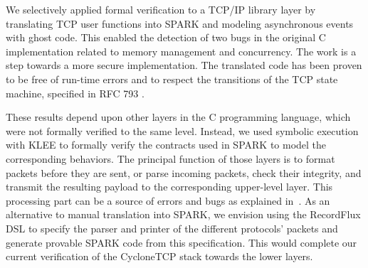 \documentclass[conference]{IEEEtran}
\begin{document}
We selectively applied formal verification to a TCP/IP library layer by translating TCP user functions into SPARK and modeling asynchronous events with ghost code. This enabled the detection of two bugs in the original C implementation related to memory management and concurrency. The work is a step towards a more secure implementation. The translated code has been proven to be free of run-time errors and to respect the transitions of the TCP state machine, specified in RFC 793 \cite{rfc793}.

These results depend upon other layers in the C programming language, which were not formally verified to the same level. Instead, we used symbolic execution with KLEE to formally verify the contracts used in SPARK to model the corresponding behaviors. The principal function of those layers is to format packets before they are sent, or parse incoming packets, check their integrity, and transmit the resulting payload to the corresponding upper-level layer. This processing part can be a source of errors and bugs as explained in~\cite{Reiher2019RecordFluxFM}. As an alternative to manual translation into SPARK, we envision using the RecordFlux DSL \cite{Reiher2019RecordFluxFM} to specify the parser and printer of the different protocols' packets and generate provable SPARK code from this specification. This would complete our current verification of the CycloneTCP stack towards the lower layers.






\end{document}
